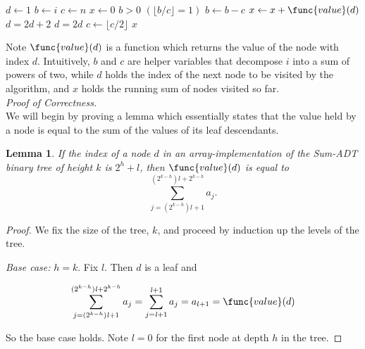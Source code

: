 \documentclass[11pt, answers]{exam}
\theoremstyle{plain}
\newtheorem{lemma}{Lemma}
\theoremstyle{definition}
\begin{document}
\begin{questions}
\begin{parts}
\begin{solution}
\begin{minipage}[t]{\linewidth}

\end{minipage}


\begin{codebox}
\li $d \gets 1$
\li $b \gets i$
\li $c \gets n$
\li $x \gets 0$
\li \While $b > 0$ \Do
\li		\If $(\lfloor b / c \rfloor = 1)$ \Then
\li 		$b \gets b - c$
\li			$x \gets x + \func{value}(d)$
\li 		$d = 2d + 2$
\li		\Else
\li			$d = 2d$	
		\End
\li	$c \gets \lfloor c / 2 \rfloor$ 		
	\End
\li \Return $x$
\end{codebox}

Note $\func{value}(d)$ is a function which returns the value of the node with index $d$. Intuitively, $b$ and $c$ are helper variables that decompose $i$ into a sum of powers of two, while $d$ holds the index of the next node to be visited by the algorithm, and $x$ holds the running sum of nodes visited so far.\\

\textit{Proof of Correctness.}\\
We will begin by proving a lemma which essentially states that the value held by a node is equal to the sum of the values of its leaf descendants.\\
\begin{lemma}
If the index of a node $d$ in an array-implementation of the Sum-ADT binary tree of height $k$ is $2^h + \mathit{l}$, then $\func{value}(d)$ is equal to \[\sum_{j = (2^{k-h})\mathit{l} + 1}^{(2^{k-h})\mathit{l} + 2^{k-h}}a_j.\]
\end{lemma}
\begin{proof}
We fix the size of the tree, $k$, and proceed by induction up the levels of the tree. 

\emph{Base case:} $h = k$. Fix $\mathit{l}$. Then $d$ is a leaf and 

\begin{gather*}
\sum_{j = (2^{k-h})\mathit{l} + 1}^{(2^{k-h})\mathit{l} + 2^{k-h}}a_j 
 = \sum_{j = \mathit{l} + 1}^{\mathit{l} + 1}a_j
 = a_{l + 1} = \func{value}(d)
\end{gather*}

So the base case holds. Note $\mathit{l} = 0$ for the first node at depth $h$ in the tree.


\end{proof}
\end{solution}
\end{parts}
\end{questions}
\end{document}
